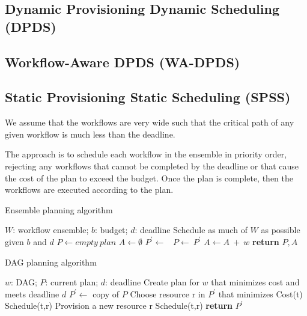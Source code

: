 \documentclass{sig-alternate}
\begin{document}
\subsection{Dynamic Provisioning Dynamic Scheduling (DPDS)}



\subsection{Workflow-Aware DPDS (WA-DPDS)}

\subsection{Static Provisioning Static Scheduling (SPSS)}

We assume that the workflows are very wide such that the critical path of any given workflow is much less than the deadline.

The approach is to schedule each workflow in the ensemble in priority order, rejecting any workflows that cannot be completed by the deadline or that cause the cost of the plan to exceed the budget. Once the plan is complete, then the workflows are executed according to the plan.

\begin{algorithm}
\caption{Ensemble planning algorithm}
\label{alg:admit}
\begin{algorithmic}[1]
\Require $W$: workflow ensemble; $b$: budget; $d$: deadline
\Ensure Schedule as much of $W$ as possible given $b$ and $d$
    \State $P\gets empty\ plan$
    \State $A\gets \emptyset$ 
        \State $P^\prime \gets$\ 
                \State $P\gets\ P^\prime$ 
                \State $A \gets A\ +\ w$ 
            \EndIf
        \EndIf
    \EndFor
    \State \textbf{return} $P,A$
\EndProcedure
\end{algorithmic} 
\end{algorithm}


\begin{algorithm}
\caption{DAG planning algorithm}
\label{alg:plandag}
\begin{algorithmic}[1]
\Require $w$: DAG; $P$: current plan; $d$: deadline
\Ensure Create plan for $w$ that minimizes cost and meets deadline $d$
    \State $P^\prime\gets$ copy of $P$
    \State {}
        \State Choose resource r in $P^\prime$ that minimizes Cost(t)
            \State Schedule(t,r)
        \Else
            \State Provision a new resource r
            \State Schedule(t,r)
        \EndIf
    \EndFor
    \State \textbf{return} $P^\prime$
\EndProcedure
\end{algorithmic} 
\end{algorithm}
\end{document}
